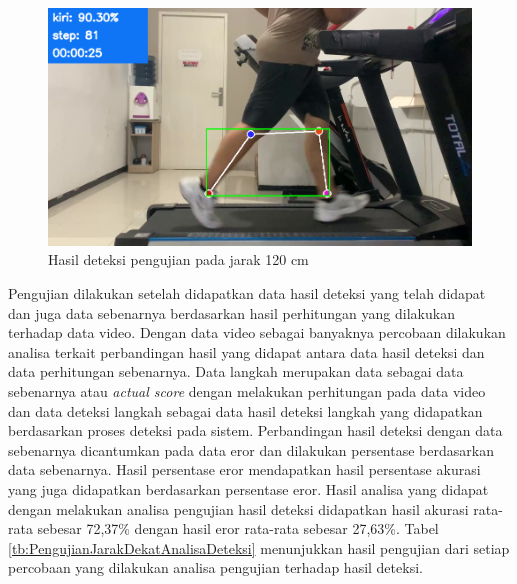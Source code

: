\begin{figure}[H]
  \centering
  \includegraphics[scale=0.5]{gambar/jarak_dekat2.png}
  \caption{Hasil deteksi pengujian pada jarak 120 cm}
  \label{fig:PengujianJarakDekat2}
\end{figure}

Pengujian dilakukan setelah didapatkan data hasil deteksi yang telah didapat dan juga data sebenarnya berdasarkan hasil perhitungan yang dilakukan terhadap data video. Dengan data video sebagai banyaknya percobaan dilakukan analisa terkait perbandingan hasil yang didapat antara data hasil deteksi dan data perhitungan sebenarnya. Data langkah merupakan data sebagai data sebenarnya atau \emph{actual score} dengan melakukan perhitungan pada data video dan data deteksi langkah sebagai data hasil deteksi langkah yang didapatkan berdasarkan proses deteksi pada sistem. Perbandingan hasil deteksi dengan data sebenarnya dicantumkan pada data eror dan dilakukan persentase berdasarkan data sebenarnya. Hasil persentase eror mendapatkan hasil persentase akurasi yang juga didapatkan berdasarkan persentase eror. Hasil analisa yang didapat dengan melakukan analisa pengujian hasil deteksi didapatkan hasil akurasi rata-rata sebesar 72,37\% dengan hasil eror rata-rata sebesar 27,63\%. Tabel \ref{tb:PengujianJarakDekatAnalisaDeteksi} menunjukkan hasil pengujian dari setiap percobaan yang dilakukan analisa pengujian terhadap hasil deteksi.

